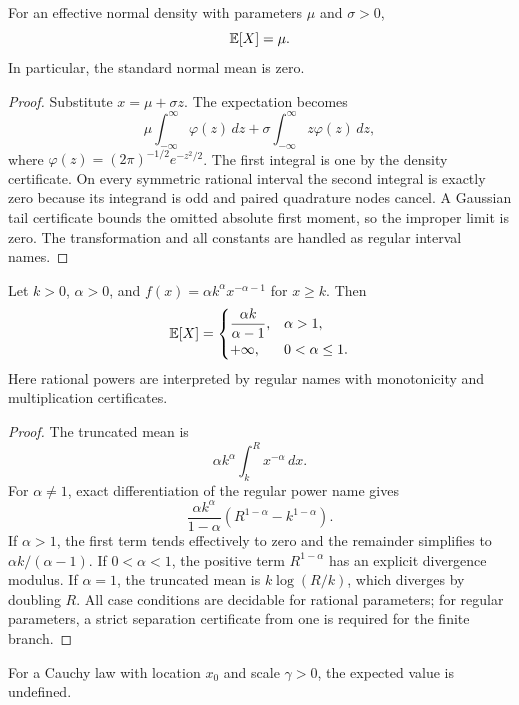 \begin{proposition}\label{prop:normal}
For an effective normal density with parameters \(\mu\) and \(\sigma>0\),
\[
 \mathbb E[X]=\mu.
\]
In particular, the standard normal mean is zero.
\end{proposition}

\begin{proof}
Substitute \(x=\mu+\sigma z\).  The expectation becomes
\[
 \mu\int_{-\infty}^{\infty}\varphi(z)\,dz
 +\sigma\int_{-\infty}^{\infty}z\varphi(z)\,dz,
\]
where \(\varphi(z)=(2\pi)^{-1/2}e^{-z^2/2}\).  The first integral is one by
the density certificate.  On every symmetric rational interval the second
integral is exactly zero because its integrand is odd and paired quadrature
nodes cancel.  A Gaussian tail certificate bounds the omitted absolute first
moment, so the improper limit is zero.  The transformation and all constants
are handled as regular interval names.
\end{proof}

\begin{proposition}[Pareto]\label{prop:pareto}
Let \(k>0\), \(\alpha>0\), and
\(f(x)=\alpha k^\alpha x^{-\alpha-1}\) for \(x\ge k\).  Then
\[
 \mathbb E[X]=
 \begin{cases}
 \dfrac{\alpha k}{\alpha-1},&\alpha>1,\\[4pt]
 +\infty,&0<\alpha\le1.
 \end{cases}
\]
Here rational powers are interpreted by regular names with monotonicity and
multiplication certificates.
\end{proposition}

\begin{proof}
The truncated mean is
\[
 \alpha k^\alpha\int_k^R x^{-\alpha}\,dx.
\]
For \(\alpha\ne1\), exact differentiation of the regular power name gives
\[
 \frac{\alpha k^\alpha}{1-\alpha}
   (R^{1-\alpha}-k^{1-\alpha}).
\]
If \(\alpha>1\), the first term tends effectively to zero and the remainder
simplifies to \(\alpha k/(\alpha-1)\).  If \(0<\alpha<1\), the positive term
\(R^{1-\alpha}\) has an explicit divergence modulus.  If \(\alpha=1\), the
truncated mean is \(k\log(R/k)\), which diverges by doubling \(R\).  All case
conditions are decidable for rational parameters; for regular parameters, a
strict separation certificate from one is required for the finite branch.
\end{proof}

\begin{proposition}[Cauchy]\label{prop:cauchy}
For a Cauchy law with location \(x_0\) and scale \(\gamma>0\), the expected
value is undefined.
\end{proposition}

